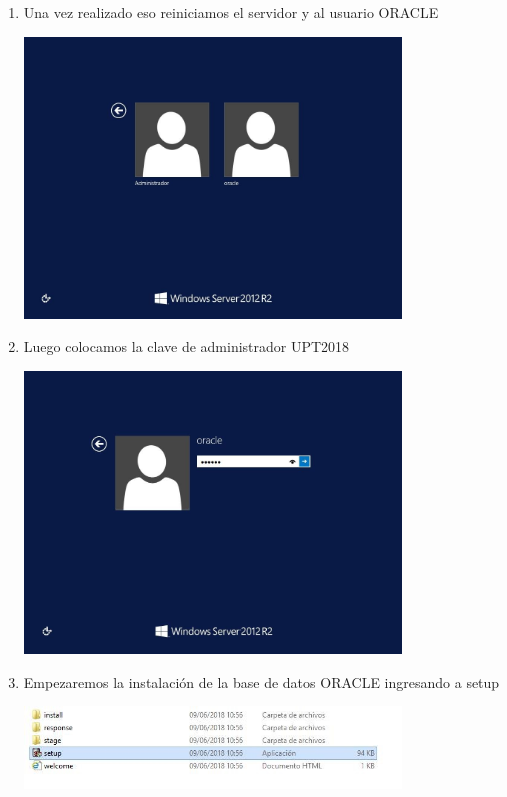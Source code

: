 \begin{enumerate}[1.]
	\hfill \break
	\hfill \break
	\hfill \break
	\hfill \break
	\hfill \break
	\hfill \break
	\hfill \break
	\hfill \break
	\item Una vez realizado eso reiniciamos el servidor y al usuario ORACLE \\
	\begin{center}
	\includegraphics[width=10cm]{./Imagenes/img7} 
	\end{center}

	\item Luego colocamos la clave de administrador UPT2018\\
	\begin{center}
	\includegraphics[width=10cm]{./Imagenes/img8} 
	\end{center}

	\item Empezaremos la instalaci\'on de la base de datos ORACLE ingresando a setup\\
	\begin{center}
	\includegraphics[width=10cm]{./Imagenes/img9} 
	\end{center}


\end{enumerate}
